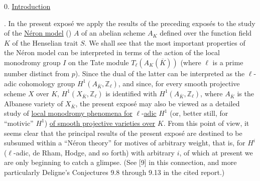 
0. \underline{Introduction}

. In the present expos\'e we apply the results of the preceding
expos\'es to the study of the \underline{N\'eron model} () $A$ of an
abelian scheme $A_K$ defined over the function field $K$ of the
Henselian trait $S$. We shall see that the most important properties of
the N\'eron model can be interpreted in terms of the action of the local
monodromy group $I$ on the Tate module
$T_\ell(A_K(\overline K))$ (where $\ell$ is a prime number distinct
from $p$). Since the dual of the latter can be interpreted as the
$\ell$-adic cohomology group $H^1(A_{\overline K},\mathbb Z_\ell)$,
and since, for every smooth projective scheme $X$ over $K$,
$H^1(X_{\overline K},\mathbb Z_\ell)$ is identified with
$H^1(A_{\overline K},\mathbb Z_\ell)$, where $A_{\overline K}$ is the
Albanese variety of $X_{\overline K}$, the present expos\'e may also be
viewed as a detailed study of \underline{local monodromy phenomena for}
$\ell$-\underline{adic} $H^1$ (or, better still, for ``motivic'' $H^1$)
\underline{of smooth projective varieties over} $K$. From this point of
view, it seems clear that the principal results of the present expos\'e
are destined to be subsumed within a ``N\'eron theory'' for motives of
arbitrary weight, that is, for $H^i$ ($\ell$-adic, de Rham, Hodge, and
so forth) with arbitrary $i$, of which at present we are only beginning
to catch a glimpse. (See [9] in this connection, and more particularly
Deligne's Conjectures 9.8 through 9.13 in the cited report.)

